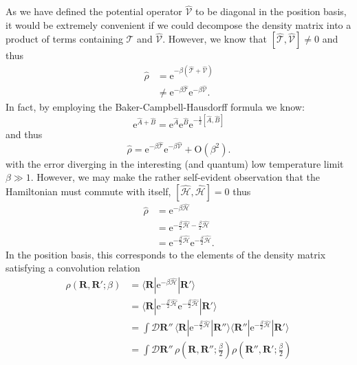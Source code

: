 \documentclass[prb,aps,amssym,nofootinbib,floatfix,notitlepage]{revtex4-1}
\renewcommand{\vec}[1]{\boldsymbol{#1}}
\newcommand{\e}[1]{\mathrm{e}^{#1}}
\newcommand{\R}{\vec{R}}
\begin{document}
As we have defined the potential operator $\hat{\mathcal{V}}$ to be diagonal in
the position basis, it would be extremely convenient if we could decompose the
density matrix into a product of terms containing $\hat{\mathcal{T}}$ and
$\hat{\mathcal{V}}$.  However, we know that
$[\hat{\mathcal{T}},\hat{\mathcal{V}}] \ne 0$ and thus
%
\begin{align}
    \hat{\rho} &= \e{-\beta(\hat{\mathcal{T}} + \hat{\mathcal{V}})} \nonumber
    \\
&\ne \e{-\beta\hat{\mathcal{T}}}\e{-\beta\hat{\mathcal{V}}}.
\end{align}
%
In fact, by employing the Baker-Campbell-Hausdorff formula we know:
%
\begin{equation}
    \e{\hat{A}+\hat{B}} = \e{\hat{A}}\e{\hat{B}}\e{-\frac{1}{2}[\hat{A},\hat{B}]}
    \label{eq:BCH}
\end{equation}
%
and thus 
%
\begin{equation}
    \hat{\rho} = \e{-\beta\hat{\mathcal{T}}}\e{-\beta\hat{\mathcal{V}}} +
    \mathrm{O}\left(\beta^2\right).
\end{equation}
%
with the error diverging in the interesting (and quantum) low temperature limit
$\beta \gg 1$.  However, we may make the rather self-evident observation that
the Hamiltonian must commute with itself,
$[\hat{\mathcal{H}},\hat{\mathcal{H}}] = 0$ thus
%
\begin{align}
    \hat{\rho} &= \e{-\beta \hat{\mathcal{H}}} \nonumber \\
               &= \e{-\frac{\beta}{2}\hat{\mathcal{H}}
-\frac{\beta}{2}\hat{\mathcal{H}}} \nonumber \\
&= \e{-\frac{\beta}{2}\hat{\mathcal{H}}}\e{-\frac{\beta}{2}\hat{\mathcal{H}}}.
\label{eq:HamCommute}
\end{align}
%
In the position basis, this corresponds to the elements of the density matrix
satisfying a convolution relation
%
\begin{align}
    \rho(\R,\R';\beta) &=  \langle \R | \e{-\beta \hat{\mathcal{H}}} | \R'\rangle \nonumber \\
    &=  \langle \R | \e{-\frac{\beta}{2} \hat{\mathcal{H}}} 
    \e{-\frac{\beta}{2} \hat{\mathcal{H}}}| \R'\rangle \nonumber \\
    &= \int \mathcal{D}\R''\,
    \langle \R | \e{-\frac{\beta}{2} \hat{\mathcal{H}}} | \R''\rangle 
    \langle \R'' | \e{-\frac{\beta}{2} \hat{\mathcal{H}}} | \R'\rangle \nonumber \\
    &= \int \mathcal{D}\R''\,
    \rho\left(\R,\R'';\frac{\beta}{2}\right)
    \rho\left(\R'',\R';\frac{\beta}{2}\right)
\label{eq:rhoConvolution}
\end{align}
\end{document}
